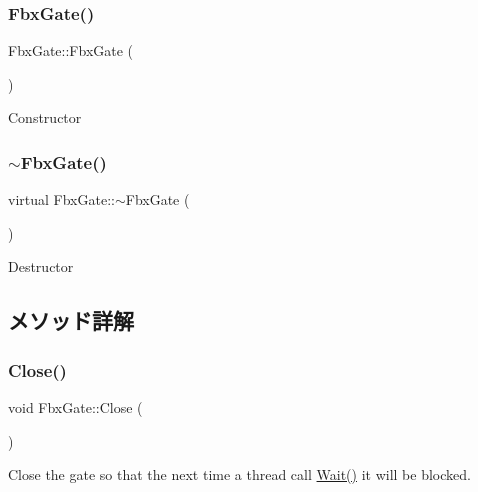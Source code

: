 \subsubsection{\texorpdfstring{Fbx\+Gate()}{FbxGate()}}
{\footnotesize\ttfamily Fbx\+Gate\+::\+Fbx\+Gate (\begin{DoxyParamCaption}{ }\end{DoxyParamCaption})}



Constructor 

\mbox{\label{class_fbx_gate_a588ebab279f8bd182bc0a1aeb6001554}} 
\subsubsection{\texorpdfstring{$\sim$\+Fbx\+Gate()}{~FbxGate()}}
{\footnotesize\ttfamily virtual Fbx\+Gate\+::$\sim$\+Fbx\+Gate (\begin{DoxyParamCaption}{ }\end{DoxyParamCaption})\hspace{0.3cm}{\ttfamily [virtual]}}



Destructor 



\subsection{メソッド詳解}
\mbox{\label{class_fbx_gate_aa91ba9c41757e0065d400f254a5175ee}} 
\subsubsection{\texorpdfstring{Close()}{Close()}}
{\footnotesize\ttfamily void Fbx\+Gate\+::\+Close (\begin{DoxyParamCaption}{ }\end{DoxyParamCaption})}

Close the gate so that the next time a thread call \hyperlink{class_fbx_gate_ad3d9e530f43a6f446c2d09364153c918}{Wait()} it will be blocked. \mbox{\label{class_fbx_gate_a96baa45cb4fa4a655201355601b6bc47}} 
